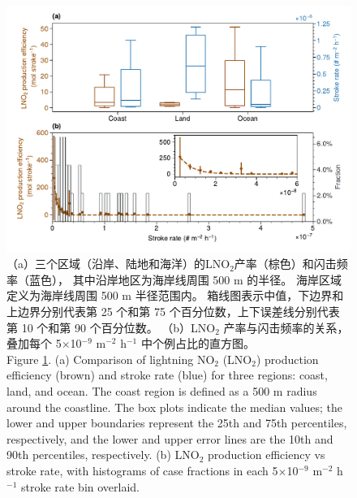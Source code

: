 \begin{figure}[!htbp]
\centering
\includegraphics[width=15cm]{./figures/arctic_pe_rate.pdf}
\caption{
（a）三个区域（沿岸、陆地和海洋）的LNO$_2$产率（棕色）和闪击频率（蓝色），
其中沿岸地区为海岸线周围 500 m 的半径。
海岸区域定义为海岸线周围 500 m 半径范围内。
箱线图表示中值，下边界和上边界分别代表第 25 个和第 75 个百分位数，上下误差线分别代表第 10 个和第 90 个百分位数。
（b）LNO$_2$ 产率与闪击频率的关系，叠加每个 5$\times$10$^{-9}$ m$^{-2}$ h$^{-1}$ 中个例占比的直方图。 \\
Figure \ref{fig:arctic_pe_rate}. (a) Comparison of lightning NO$_2$ (LNO$_2$) production efficiency (brown) and stroke rate (blue) for three regions: coast, land, and ocean.
The coast region is defined as a 500 m radius around the coastline.
The box plots indicate the median values; the lower and upper boundaries represent the 25th and 75th percentiles, respectively, and the lower and upper error lines are the 10th and 90th percentiles, respectively.
(b) LNO$_2$ production efficiency vs stroke rate, with histograms of case fractions in each 5$\times$10$^{-9}$ m$^{-2}$ h$^{-1}$ stroke rate bin overlaid.
}
\label{fig:arctic_pe_rate}
\end{figure}


